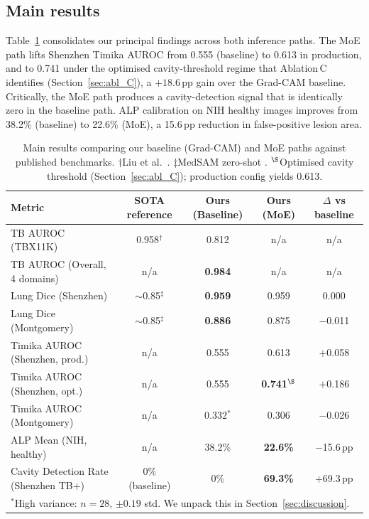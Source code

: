 \documentclass{article}
\begin{document}
\subsection{Main results}

Table~\ref{tab:main_results} consolidates our principal findings across both inference paths. The MoE path lifts Shenzhen Timika AUROC from 0.555 (baseline) to 0.613 in production, and to 0.741 under the optimised cavity-threshold regime that Ablation\,C identifies (Section~\ref{sec:abl_C}), a $+18.6$\,pp gain over the Grad-CAM baseline. Critically, the MoE path produces a cavity-detection signal that is identically zero in the baseline path. ALP calibration on NIH healthy images improves from 38.2\% (baseline) to 22.6\% (MoE), a 15.6\,pp reduction in false-positive lesion area.

\begin{table}[!htbp]
\caption{Main results comparing our baseline (Grad-CAM) and MoE paths against published benchmarks. $\dagger$Liu et al.\ \cite{liu2020tbx11k}. $\ddagger$MedSAM zero-shot \cite{ma2024medsam}. $^\S$Optimised cavity threshold (Section~\ref{sec:abl_C}); production config yields 0.613.}
\label{tab:main_results}
\centering
\small
\begin{tabular}{lcccc}
\toprule
Metric & SOTA reference & Ours (Baseline) & Ours (MoE) & $\Delta$ vs baseline \\
\midrule
TB AUROC (TBX11K) & 0.958$^\dagger$ & 0.812 & n/a & n/a \\
TB AUROC (Overall, 4 domains) & n/a & \textbf{0.984} & n/a & n/a \\
Lung Dice (Shenzhen) & $\sim$0.85$^\ddagger$ & \textbf{0.959} & 0.959 & 0.000 \\
Lung Dice (Montgomery) & $\sim$0.85$^\ddagger$ & \textbf{0.886} & 0.875 & $-$0.011 \\
Timika AUROC (Shenzhen, prod.) & n/a & 0.555 & 0.613 & $+$0.058 \\
Timika AUROC (Shenzhen, opt.) & n/a & 0.555 & \textbf{0.741}$^\S$ & $+$0.186 \\
Timika AUROC (Montgomery) & n/a & 0.332$^*$ & 0.306 & $-$0.026 \\
ALP Mean (NIH, healthy) & n/a & 38.2\% & \textbf{22.6\%} & $-$15.6\,pp \\
Cavity Detection Rate (Shenzhen TB+) & 0\% (baseline) & 0\% & \textbf{69.3\%} & $+$69.3\,pp \\
\bottomrule
\multicolumn{5}{l}{\footnotesize $^*$High variance: $n=28$, $\pm 0.19$ std. We unpack this in Section~\ref{sec:discussion}.}
\end{tabular}
\end{table}
\end{document}
